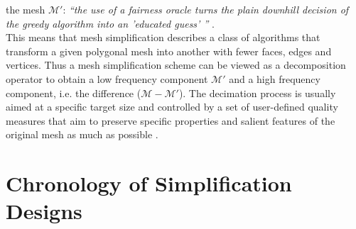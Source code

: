 the mesh $\mathcal{M'}$: \textit{``the use of a fairness oracle turns the plain downhill decision of the greedy algorithm into an 'educated guess' ''} \citep[][p.46]{Kobbelt1998}.\\
This means that mesh simplification describes a class of algorithms that transform a given polygonal mesh into another with fewer faces, edges and vertices.
Thus a mesh simplification scheme can be viewed as a decomposition operator to obtain a low frequency component $\mathcal{M'}$ and a high frequency component, i.e. the difference ($\mathcal{M} - \mathcal{M'}$).
The decimation process is usually aimed at a specific target size and controlled by a set of user-defined quality measures that aim to preserve specific properties and salient features of the original mesh as much as possible \citep[][cf. pp.9-10]{Shene2005}.

\section{Chronology of Simplification Designs}
\label{simplification2}

